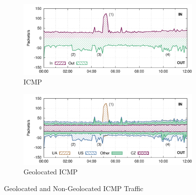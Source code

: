 \begin{figure}[!tb]
    \centering
    \begin{subfigure}[t]{\textwidth}
        \includegraphics[width=\textwidth]{figures/paper-geolocation/icmp/packets}
        \caption{ICMP}
        \label{fig:geo-icmp-traffic}
    \end{subfigure}%
    \hfill
    \begin{subfigure}[t]{\textwidth}
        \includegraphics[width=\textwidth]{figures/paper-geolocation/icmp-geo/packets}
        \caption{Geolocated ICMP}
        \label{fig:geo-icmp-geo-traffic}
    \end{subfigure}
    \caption{Geolocated and Non-Geolocated ICMP Traffic}
    \label{fig:geo-icmp}
\end{figure}

